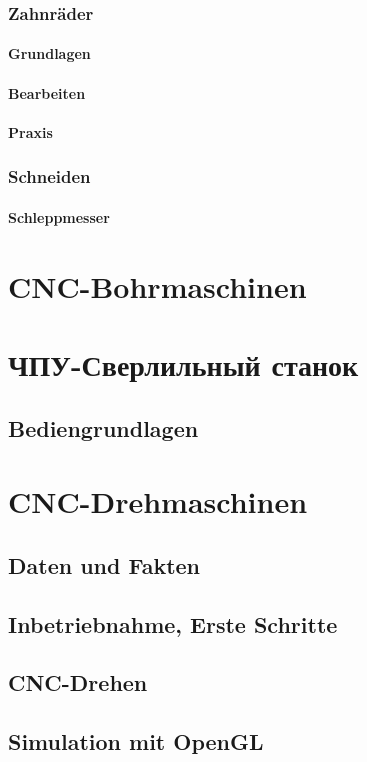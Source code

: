 \documentclass[14pt,a4paper]{book}
\begin{document}
		\subsection{Zahnräder} 
			\subsubsection{Grundlagen} 
			\subsubsection{Bearbeiten} 
			\subsubsection{Praxis} 			
		\subsection{Schneiden} 
			\subsubsection{Schleppmesser} 
		 
\chapter{CNC-Bohrmaschinen} 
\chapter{ЧПУ-Сверлильный станок} 
	\section{Bediengrundlagen}

\chapter{CNC-Drehmaschinen}
	\section{Daten und Fakten} 
	\section{Inbetriebnahme, Erste Schritte} 
	\section{CNC-Drehen} 
	\section{Simulation mit OpenGL} 
\end{document}
